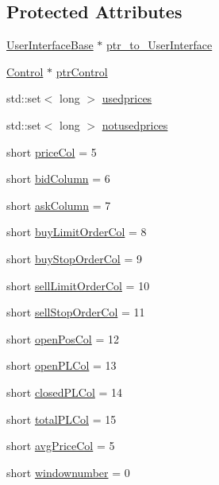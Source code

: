 \subsection*{Protected Attributes}
\begin{DoxyCompactItemize}
\item 
\hyperlink{class_mike_1_1_user_interface_base}{User\+Interface\+Base} $\ast$ \hyperlink{class_mike_1_1_widget_table_a460f10100176575e81fdab9aa342f1fc}{ptr\+\_\+to\+\_\+\+User\+Interface}
\item 
\hyperlink{class_mike_1_1_control}{Control} $\ast$ \hyperlink{class_mike_1_1_widget_table_a99eeaeb402037858e27985daf341c295}{ptr\+Control}
\item 
std\+::set$<$ long $>$ \hyperlink{class_mike_1_1_widget_table_a2be8c41838500d0e8cc343f873123627}{usedprices}
\item 
std\+::set$<$ long $>$ \hyperlink{class_mike_1_1_widget_table_a4a046800392a9e7685f8650495b938aa}{notusedprices}
\item 
short \hyperlink{class_mike_1_1_widget_table_a11872a3f7b12c24408afa775e535b355}{price\+Col} = 5
\item 
short \hyperlink{class_mike_1_1_widget_table_a4e008648f0bc010c2bbde1fc549002b7}{bid\+Column} = 6
\item 
short \hyperlink{class_mike_1_1_widget_table_aa7a40e478418cd985cade406cbd842bf}{ask\+Column} = 7
\item 
short \hyperlink{class_mike_1_1_widget_table_ac3572ce4e7d0c7aa5a1fcca70cbdb9fd}{buy\+Limit\+Order\+Col} = 8
\item 
short \hyperlink{class_mike_1_1_widget_table_a11086c367b264f5f89c81d84a57175f1}{buy\+Stop\+Order\+Col} = 9
\item 
short \hyperlink{class_mike_1_1_widget_table_a0c380b42a2fdd90e5611c178459a0220}{sell\+Limit\+Order\+Col} = 10
\item 
short \hyperlink{class_mike_1_1_widget_table_ab2ccfe721d6f46bec502537be80500b0}{sell\+Stop\+Order\+Col} = 11
\item 
short \hyperlink{class_mike_1_1_widget_table_a22fc35da5771db1fabacf89707e1460e}{open\+Pos\+Col} = 12
\item 
short \hyperlink{class_mike_1_1_widget_table_a6d455e6428a049b73ca5abc431b2e435}{open\+P\+L\+Col} = 13
\item 
short \hyperlink{class_mike_1_1_widget_table_a4f69dde53abb4ecf06a6c773f002e174}{closed\+P\+L\+Col} = 14
\item 
short \hyperlink{class_mike_1_1_widget_table_acff6706430ba0825b29cefd5f4cac752}{total\+P\+L\+Col} = 15
\item 
short \hyperlink{class_mike_1_1_widget_table_a1663756da4a083698f606af83a1b2447}{avg\+Price\+Col} = 5
\item 
short \hyperlink{class_mike_1_1_widget_table_a16ce4e53a1c455b630399f87d154e5ed}{windownumber} = 0
\end{DoxyCompactItemize}

